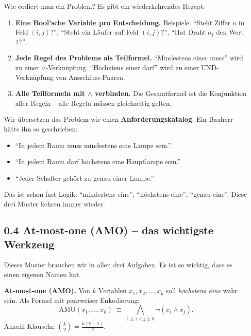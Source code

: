 \documentclass[a4paper,12pt]{article}
\begin{document}
Wie codiert man ein Problem? Es gibt ein wiederkehrendes Rezept:

\begin{merkbox}[title={Strategie: Problem $\to$ Formel}]
\begin{enumerate}[nosep]
\item \textbf{Eine Bool'sche Variable pro Entscheidung.} Beispiele:
      "`Steht Ziffer $n$ in Feld $(i,j)$?"', "`Steht ein L\"aufer auf
      Feld $(i,j)$?"', "`Hat Draht $o_1$ den Wert $1$?"'.
\item \textbf{Jede Regel des Problems als Teilformel.} "`Mindestens
      einer muss"' wird zu einer $\vee$-Verkn\"upfung. "`H\"ochstens
      einer darf"' wird zu einer UND-Verkn\"upfung von
      Ausschluss-Paaren.
\item \textbf{Alle Teilformeln mit $\wedge$ verbinden.} Die
      Gesamtformel ist die Konjunktion aller Regeln -- alle Regeln
      m\"ussen gleichzeitig gelten.
\end{enumerate}
\end{merkbox}

\begin{analogie}
Wir \"ubersetzen das Problem wie einen \textbf{Anforderungskatalog}.
Ein Bauherr h\"atte ihn so geschrieben:
\begin{itemize}[nosep]
\item "`In jedem Raum muss mindestens eine Lampe sein."'
\item "`In jedem Raum darf h\"ochstens eine Hauptlampe sein."'
\item "`Jeder Schalter geh\"ort zu genau einer Lampe."'
\end{itemize}
Das ist schon fast Logik: "`mindestens eine"', "`h\"ochstens eine"',
"`genau eine"'. Diese drei Muster kehren immer wieder.
\end{analogie}

\subsection*{0.4 At-most-one (AMO) -- das wichtigste Werkzeug}

Dieses Muster brauchen wir in allen drei Aufgaben. Es ist so wichtig,
dass es einen eigenen Namen hat.

\begin{merkbox}
\textbf{At-most-one (AMO).} Von $k$ Variablen $x_1, x_2, \ldots, x_k$
soll \emph{h\"ochstens eine} wahr sein. Als Formel mit
paarweiser Enkodierung:
\[
\text{AMO}(x_1, \ldots, x_k)
\;\equiv\;
\bigwedge_{1 \le i < j \le k} \neg(x_i \wedge x_j).
\]
Anzahl Klauseln: $\binom{k}{2} = \frac{k(k-1)}{2}$.
\end{merkbox}
\end{document}
